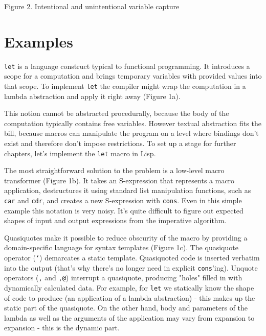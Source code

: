 \documentclass[10pt,journal,a4paper]{IEEEtran}
\begin{document}
\begin{figure*}
\hskip5.05cm
\normalsize Figure 2. Intentional and unintentional variable capture
\end{figure*}

\section{Examples}

\small \texttt{let} \normalsize is a language construct typical to functional programming. It introduces
a scope for a computation and brings temporary variables with provided values into that scope.
To implement \small \texttt{let} \normalsize the compiler might wrap the computation in a lambda abstraction
and apply it right away (Figure 1a).

This notion cannot be abstracted procedurally, because the body of the computation typically
contains free variables. However textual abstraction fits the bill, because macros can manipulate
the program on a level where bindings don't exist and therefore don't impose restrictions.
To set up a stage for further chapters, let's implement the \small \texttt{let} \normalsize macro in Lisp.

The most straightforward solution to the problem is a low-level macro transformer (Figure 1b).
It takes an S-expression that represents a macro application, destructures it using standard
list manipulation functions, such as \small \texttt{car} and \small \texttt{cdr}\normalsize,
and creates a new S-expression with \small \texttt{cons}\normalsize.
Even in this simple example this notation is very noisy. It's quite difficult
to figure out expected shapes of input and output expressions from the imperative algorithm.

Quasiquotes \cite{bawden99} make it possible to reduce obscurity of the macro by providing
a domain-specific language for syntax templates (Figure 1c). The quasiquote operator (\texttt{`})
demarcates a static template. Quasiquoted code is inserted verbatim into the output
(that's why there's no longer need in explicit \small \texttt{cons}\normalsize'ing).
Unquote operators (\texttt{,}
and \texttt{,@}) interrupt a quasiquote, producing "holes" filled in with dynamically calculated
data. For example, for \small \texttt{let} \normalsize we statically know the shape of code to produce
(an application of a lambda abstraction) - this makes up the static part of the quasiquote. On the other hand,
body and parameters of the lambda as well as the arguments of the application may vary from
expansion to expansion - this is the dynamic part.
\end{document}
